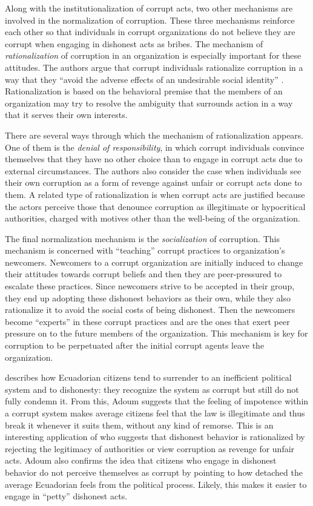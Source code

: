 \documentclass[floatsintext,man]{apa7}\usepackage[]{graphicx}\usepackage[]{color}
\begin{document}
Along with the institutionalization of corrupt acts, two other mechanisms are involved in the normalization of corruption. These three mechanisms reinforce each other so that individuals in corrupt organizations do not believe they are corrupt when engaging in dishonest acts as bribes. The mechanism of \textit{rationalization} of corruption in an organization is especially important for these attitudes. The authors argue that corrupt individuals rationalize corruption in a way that they \enquote{avoid the adverse effects of an undesirable social identity} \parencite[p.13]{Ashforth.2003}. Rationalization is based on the behavioral premise that the members of an organization may try to resolve the ambiguity that surrounds action in a way that it serves their own interests. 

There are several ways through which the mechanism of rationalization appears. One of them is the \textit{denial of responsibility}, in which corrupt individuals convince themselves that they have no other choice than to engage in corrupt acts due to external circumstances. The authors also consider the case when individuals see their own corruption as a form of revenge against unfair or corrupt acts done to them. A related type of rationalization is when corrupt acts are justified because the actors perceive those that denounce corruption as illegitimate or hypocritical authorities, charged with motives other than the well-being of the organization.

The final normalization mechanism is the \textit{socialization} of corruption. This mechanism is concerned with \enquote{teaching} corrupt practices to organization's newcomers. Newcomers to a corrupt organization are initially induced to change their attitudes towards corrupt beliefs and then they are peer-pressured to escalate these practices. Since newcomers strive to be accepted in their group, they end up adopting these dishonest behaviors as their own, while they also rationalize it to avoid the social costs of being dishonest. Then the newcomers become \enquote{experts} in these corrupt practices and are the ones that exert peer pressure on to the future members of the organization. This mechanism is key for corruption to be perpetuated after the initial corrupt agents leave the organization.

\textcite{Adoum.2000} describes how Ecuadorian citizens tend to surrender to an inefficient political system and to dishonesty: they recognize the system as corrupt but still do not fully condemn it. From this, Adoum suggests that the feeling of impotence within a corrupt system makes average citizens feel that the law is illegitimate and thus break it whenever it suits them, without any kind of remorse. This is an interesting application of \textcite{Ashforth.2003} who suggests that dishonest behavior is rationalized by rejecting the legitimacy of authorities or view corruption as revenge for unfair acts. Adoum also confirms the idea that citizens who engage in dishonest behavior do not perceive themselves as corrupt by pointing to how detached the average Ecuadorian feels from the political process. Likely, this makes it easier to engage in \enquote{petty} dishonest acts.
\end{document}
